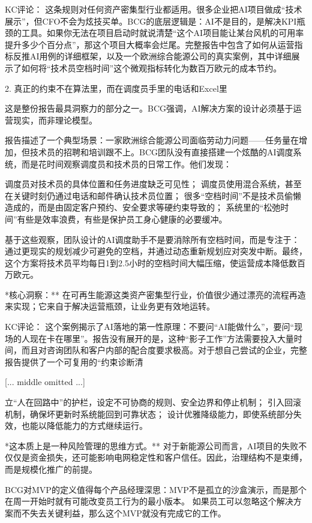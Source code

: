 \documentclass[11pt]{ctexart}
\begin{document}
KC评论： 这条规则对任何资产密集型行业都适用。很多企业把AI项目做成“技术展示”，但CFO不会为炫技买单。BCG的底层逻辑是：AI不是目的，是解决KPI瓶颈的工具。如果你无法在项目启动时就说清楚“这个AI项目能让某台风机的可用率提升多少个百分点”，那这个项目大概率会烂尾。完整报告中包含了如何从运营指标反推AI用例的详细框架，以及一个欧洲综合能源公司的真实案例，其中详细展示了如何将“技术员空档时间”这个微观指标转化为数百万欧元的成本节约。

2. 真正的约束不在算法里，而在调度员手里的电话和Excel里

这是整份报告最具洞察力的部分之一。BCG强调，AI解决方案的设计必须基于运营现实，而非理论模型。

报告描述了一个典型场景：一家欧洲综合能源公司面临劳动力问题——任务量在增加，但技术员的招聘和培训跟不上。BCG团队没有直接搭建一个炫酷的AI调度系统，而是花时间观察调度员和技术员的日常工作。他们发现：

调度员对技术员的具体位置和任务进度缺乏可见性； 调度员使用混合系统，甚至在关键时刻仍通过电话和邮件确认技术员位置； 很多“空档时间”不是技术员偷懒造成的，而是由固定客户预约、安全要求等硬约束导致的； 系统里的“松弛时间”有些是效率浪费，有些是保护员工身心健康的必要缓冲。

基于这些观察，团队设计的AI调度助手不是要消除所有空档时间，而是专注于：通过更现实的规划减少可避免的空档，并通过动态重新规划应对突发中断。最终，这个方案将技术员平均每日1到2.5小时的空档时间大幅压缩，使运营成本降低数百万欧元。

*核心洞察：** 在可再生能源这类资产密集型行业，价值很少通过漂亮的流程再造来实现；它来自于解决运营瓶颈，让业务更有效地运转。

KC评论： 这个案例揭示了AI落地的第一性原理：不要问“AI能做什么”，要问“现场的人现在卡在哪里”。报告没有展开的是，这种“影子工作”方法需要投入大量时间，而且对咨询团队和客户内部的配合度要求极高。对于想自己尝试的企业，完整报告提供了一个可复用的“约束诊断清

[... middle omitted ...]

立“人在回路中”的护栏，设定不可协商的规则、安全边界和停止机制； 引入回滚机制，确保坏更新时系统能回到可靠状态； 设计优雅降级能力，即使系统部分失效，也能以降低能力的方式继续运行。

*这本质上是一种风险管理的思维方式。** 对于新能源公司而言，AI项目的失败不仅仅是资金损失，还可能影响电网稳定性和客户信任。因此，治理结构不是束缚，而是规模化推广的前提。

BCG对MVP的定义值得每个产品经理深思：MVP不是孤立的沙盒演示，而是那个在周一开始时就有可能改变员工行为的最小版本。 如果员工可以忽略这个解决方案而不失去关键利益，那么这个MVP就没有完成它的工作。
\end{document}
